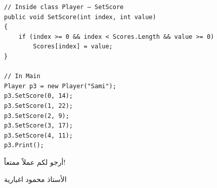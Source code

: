 \documentclass[14pt]{extarticle}
\begin{document}
\begin{enumerate}
\begin{english}
{\begin{verbatim}
// Inside class Player — SetScore
public void SetScore(int index, int value)
{
    if (index >= 0 && index < Scores.Length && value >= 0)
        Scores[index] = value;
}

// In Main
Player p3 = new Player("Sami");
p3.SetScore(0, 14);
p3.SetScore(1, 22);
p3.SetScore(2, 9);
p3.SetScore(3, 17);
p3.SetScore(4, 11);
p3.Print();
\end{verbatim}
}
\end{english}
\fi

\end{enumerate}

\vspace{1em}
\begin{flushleft}
أرجو لكم عملاً ممتعاً!

الأستاذ محمود اغبارية
\end{flushleft}
\end{document}
